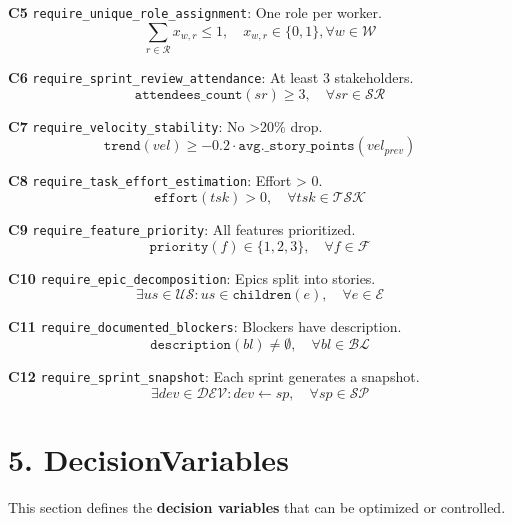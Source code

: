 \documentclass[12pt]{article}
\begin{document}
    \item[\textbf{C5}] \texttt{require\_unique\_role\_assignment}: One role per worker.
    \[
    \sum_{r \in \mathcal{R}} x_{w,r} \leq 1, \quad x_{w,r} \in \{0,1\}, \forall w \in \mathcal{W}
    \]

    \item[\textbf{C6}] \texttt{require\_sprint\_review\_attendance}: At least 3 stakeholders.
    \[
    \texttt{attendees\_count}(sr) \geq 3, \quad \forall sr \in \mathcal{SR}
    \]

    \item[\textbf{C7}] \texttt{require\_velocity\_stability}: No >20\% drop.
    \[
    \texttt{trend}(vel) \geq -0.2 \cdot \texttt{avg.\_story\_points}(vel_{prev})
    \]

    \item[\textbf{C8}] \texttt{require\_task\_effort\_estimation}: Effort > 0.
    \[
    \texttt{effort}(tsk) > 0, \quad \forall tsk \in \mathcal{TSK}
    \]

    \item[\textbf{C9}] \texttt{require\_feature\_priority}: All features prioritized.
    \[
    \texttt{priority}(f) \in \{1,2,3\}, \quad \forall f \in \mathcal{F}
    \]

    \item[\textbf{C10}] \texttt{require\_epic\_decomposition}: Epics split into stories.
    \[
    \exists us \in \mathcal{US}: us \in \texttt{children}(e), \quad \forall e \in \mathcal{E}
    \]

    \item[\textbf{C11}] \texttt{require\_documented\_blockers}: Blockers have description.
    \[
    \texttt{description}(bl) \neq \emptyset, \quad \forall bl \in \mathcal{BL}
    \]

    \item[\textbf{C12}] \texttt{require\_sprint\_snapshot}: Each sprint generates a snapshot.
    \[
    \exists dev \in \mathcal{DEV}: dev \leftarrow sp, \quad \forall sp \in \mathcal{SP}
    \]

\section{5. DecisionVariables}

This section defines the \textbf{decision variables} that can be optimized or controlled.
\end{document}
